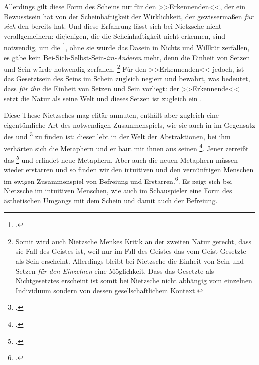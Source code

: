 \documentclass[12pt, a4paper, openany]{report}
\begin{document}
Allerdings gilt diese Form des Scheins nur für den >>Erkennenden<<, der ein Bewusstsein hat von der Scheinhaftigkeit der Wirklichkeit, der gewissermaßen \emph{für sich} den  bereits  hat.
Und diese Erfahrung lässt sich bei Nietzsche nicht verallgemeinern:
diejenigen, die die Scheinhaftigkeit nicht erkennen, sind notwendig, um die \footcite[][417]{nietzsche_morgenrote_1999}, ohne sie würde das Dasein in Nichts und Willkür zerfallen, es gäbe kein Bei-Sich-Selbst-Sein-\emph{im-Anderen} mehr, denn die Einheit von Setzen und Sein würde notwendig zerfallen.%
\footnote{
    Somit wird auch Nietzsche Menkes Kritik an der zweiten Natur gerecht, dass sie Fall des Geistes ist, weil nur im Fall des Geistes das vom Geist Gesetzte als Sein erscheint. 
    Allerdings bleibt bei Nietzsche die Einheit von Sein und Setzen \emph{für den Einzelnen} eine Möglichkeit. 
    Dass das Gesetzte als Nichtgesetztes erscheint ist somit bei Nietzsche nicht abhängig vom einzelnen Individuum sondern von dessen gesellschaftlichem Kontext.
} 
Für den >>Erkennenden<< jedoch, ist das Gesetztsein des Seins im Schein zugleich negiert und bewahrt, was bedeutet, dass \emph{für ihn} die Einheit von Setzen und Sein vorliegt:
der >>Erkennende<< setzt die Natur als seine Welt und dieses Setzen ist zugleich ein . 

Diese These Nietzsches mag elitär anmuten, enthält aber zugleich eine eigentümliche Art des notwendigen Zusammenspiels, wie sie auch in  im Gegensatz des  und \footcite[][889]{nietzsche_geburt_1999} zu finden ist: 
dieser lebt in der Welt der Abstraktionen, bei ihm verhärten sich die Metaphern und er baut mit ihnen aus  seinen \footcite[][S. 882ff.]{nietzsche_geburt_1999}.
Jener zerreißt das \footcite[][S. 877ff.]{nietzsche_geburt_1999} und erfindet neue Metaphern.
Aber auch die neuen Metaphern müssen wieder erstarren und so finden wir den intuitiven und den vernünftigen Menschen im ewigen Zusammenspiel von Befreiung und Erstarren.\footcite[Vergleiche dazu auch: ][62]{stephan_nietzscheanismus_2019}.
Es zeigt sich bei Nietzsche im intuitiven Menschen, wie auch im Schauspieler eine Form des ästhetischen Umgangs mit dem Schein und damit auch der Befreiung. 
\\
\end{document}
